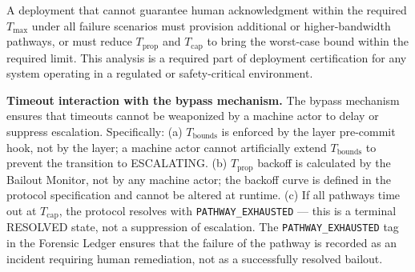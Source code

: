 A deployment that cannot guarantee human acknowledgment within the required $T_{\max}$ under all failure scenarios must provision additional or higher-bandwidth pathways, or must reduce $T_{\text{prop}}$ and $T_{\text{cap}}$ to bring the worst-case bound within the required limit. This analysis is a required part of deployment certification for any \bxthree{} system operating in a regulated or safety-critical environment.

\bigskip
\noindent\textbf{Timeout interaction with the bypass mechanism.} The bypass mechanism ensures that timeouts cannot be weaponized by a machine actor to delay or suppress escalation. Specifically: (a) $T_{\text{bounds}}$ is enforced by the \fact{} layer pre-commit hook, not by the \bounds{} layer; a machine actor cannot artificially extend $T_{\text{bounds}}$ to prevent the transition to ESCALATING. (b) $T_{\text{prop}}$ backoff is calculated by the Bailout Monitor, not by any machine actor; the backoff curve is defined in the protocol specification and cannot be altered at runtime. (c) If all pathways time out at $T_{\text{cap}}$, the protocol resolves with \texttt{PATHWAY\_EXHAUSTED} --- this is a terminal RESOLVED state, not a suppression of escalation. The \texttt{PATHWAY\_EXHAUSTED} tag in the Forensic Ledger ensures that the failure of the pathway is recorded as an incident requiring human remediation, not as a successfully resolved bailout.
